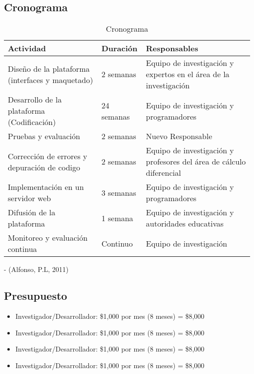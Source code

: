 \documentclass{article}
\begin{document}
\begin{table}[h]
  \subsection{Cronograma}

  \centering
  \begin{tabular}{|p{4cm}|p{3cm}|p{5cm}|} 
  \hline 
  \textbf{Actividad} & \textbf{Duración} & \textbf{Responsables} \\ 
  \hline 
  Diseño de la plataforma (interfaces y maquetado) & 2 semanas & Equipo de investigación y expertos en el área de la investigación\\ %
  \hline 
  Desarrollo de la plataforma (Codificación) & 24 semanas & Equipo de investigación y programadores \\ %
  \hline 
  Pruebas y evaluación  & 2 semanas & Nuevo Responsable \\ 
  \hline 
  Corrección de errores y depuración de codigo & 2 semanas & Equipo de investigación y profesores del área de cálculo diferencial\\ %
  \hline
  Implementación en un servidor web &3 semanas &Equipo de investigación y programadores\\
  \hline
  Difusión de la plataforma & 1 semana & Equipo de investigación y autoridades educativas\\
  \hline
  Monitoreo y evaluación continua & Continuo & Equipo de investigación\\
  \hline

  \end{tabular}
  \caption{Cronograma} 
  \label{tabla_ejemplo} 
  \cite{Alfonso} - (Alfonso, P.L, 2011)
\end{table}
\subsection{Presupuesto}
\begin{itemize}
  \item Investigador/Desarrollador: \$1,000 por mes (8 meses) = \$8,000
  \item Investigador/Desarrollador: \$1,000 por mes (8 meses) = \$8,000
  \item Investigador/Desarrollador: \$1,000 por mes (8 meses) = \$8,000
  \item Investigador/Desarrollador: \$1,000 por mes (8 meses) = \$8,000
\end{itemize} 
\end{document}
